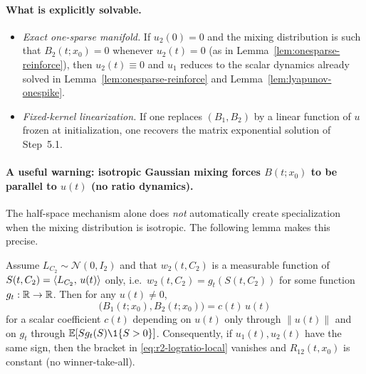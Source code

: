\paragraph{What is explicitly solvable.}
\begin{itemize}
\item \emph{Exact one-sparse manifold.} If $u_2(0)=0$ and the mixing distribution is such that $B_2(t;x_0)=0$ whenever $u_2(t)=0$ (as in Lemma~\ref{lem:onesparse-reinforce}), then $u_2(t)\equiv 0$ and $u_1$ reduces to the scalar dynamics already solved in Lemma~\ref{lem:onesparse-reinforce} and Lemma~\ref{lem:lyapunov-onespike}.
\item \emph{Fixed-kernel linearization.} If one replaces $(B_1,B_2)$ by a linear function of $u$ frozen at initialization, one recovers the matrix exponential solution of Step~5.1.
\end{itemize}

\paragraph{A useful warning: isotropic Gaussian mixing forces $B(t;x_0)$ to be parallel to $u(t)$ (no ratio dynamics).}
The half-space mechanism alone does \emph{not} automatically create specialization when the mixing distribution is isotropic.
The following lemma makes this precise.

\begin{lemma}\label{lem:isotropic-no-specialization}
\provedflag
Assume $L_{C_2}\sim\mathcal{N}(0,I_2)$ and that $w_2(t,C_2)$ is a measurable function of $S(t,C_2)=\left\langle L_{C_2},\,u(t) \right\rangle$ only, i.e.\ $w_2(t,C_2)=g_t(S(t,C_2))$ for some function $g_t:\mathbb{R}\to\mathbb{R}$.
Then for any $u(t)\neq 0$,
\[
\big(B_1(t;x_0),B_2(t;x_0)\big)=c(t)\,u(t)
\]
for a scalar coefficient $c(t)$ depending on $u(t)$ only through $\|u(t)\|$ and on $g_t$ through $\E[Sg_t(S)\1\{S>0\}]$.
Consequently, if $u_1(t),u_2(t)$ have the same sign, then the bracket in \eqref{eq:r2-logratio-local} vanishes and $R_{12}(t,x_0)$ is constant (no winner-take-all).
\end{lemma}

